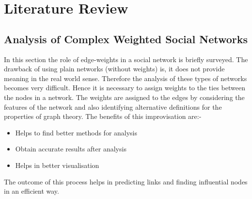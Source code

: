 \chapter{Literature Review}
\ifpdf
    \graphicspath{{Chapter1/Chapter1Figs/PNG/}{Chapter1/Chapter1Figs/PDF/}{Chapter1/Chapter1Figs/}}
\else
    \graphicspath{{Chapter1/Chapter1Figs/EPS/}{Chapter1/Chapter1Figs/}}
\fi


\section{Analysis of Complex Weighted Social Networks}

In this section the role of edge-weights in a social network is briefly surveyed. The drawback of using plain networks (without weights) is, it does not provide meaning in the real world sense. Therefore the analysis of these types of networks becomes very difficult. Hence it is necessary to assign weights to the ties between the nodes in a network. The weights are assigned to the edges by considering the features of the network and also identifying alternative definitions for the properties of graph theory. The benefits of this improvisation are:-
\begin{itemize}
\item Helps to find better methods for analysis
\item Obtain accurate results after analysis
\item Helps in better visualisation
\end{itemize}

The outcome of this process helps in predicting links and finding influential nodes in an efficient way.

